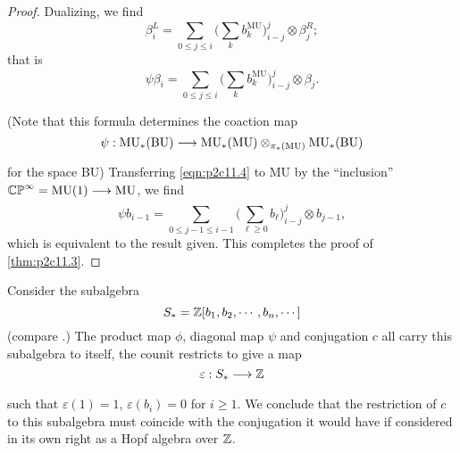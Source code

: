 \documentclass[../main]{subfiles}
\begin{document}
\begin{proof}
Dualizing, we find \[\beta_i^L = \sum_{0 \le j \le i} \bigg(\sum_k b_k^{\mathrm{MU}}\bigg)_{i - j}^j \otimes \beta_j^R;\] that is 
\begin{equation}
\tag{11.4} 
\label{eqn:p2c11.4}
\psi \beta_i = \sum_{0 \le j \le i} \bigg(\sum_k b_k^{\mathrm{MU}}\bigg)_{i - j}^j \otimes \beta_j.
\end{equation}

(Note that this formula determines the coaction map \[\psi : \mathrm{MU}_\ast(\mathrm {BU}) \lar{} \mathrm{MU}_\ast(\mathrm{MU}) \otimes_{\pi_\ast(\mathrm{MU})} \mathrm{MU}_\ast(\mathrm{BU})\] for the space BU) Transferring \eqref{eqn:p2c11.4} to MU by the ``inclusion'' $\mathbb {CP}^\infty = \mathrm{MU}(1) \lar{} \mathrm{MU}$, we find \[\psi b_{i - 1} = \sum_{0 \le j - 1 \le i - 1} \bigg(\sum_{\ell \ge 0} b_{\ell}\bigg)^j_{i - j} \otimes b_{j - 1},\] which is equivalent to the result given. This completes the proof of \eqref{thm:p2c11.3}.
\end{proof}

\begin{notes}
Consider the subalgebra \[S_\ast = \mathbb{Z}[b_1, b_2, \cdots, b_n, \cdots]\] (compare \cite[p.~20, Theorem 6.3]{adams2}.) The product map $\phi$, diagonal map $\psi$ and conjugation $c$ all carry this subalgebra to itself, the counit restricts to give a map \[\varepsilon : S_\ast \lar{} \bbZ\] such that $\varepsilon(1) = 1$, $\varepsilon(b_i) = 0$ for $i \ge 1$. We conclude that the restriction of $c$ to this subalgebra must coincide with the conjugation it would have if considered in its own right as a Hopf algebra over $\mathbb{Z}$. 
\end{notes}
\end{document}
